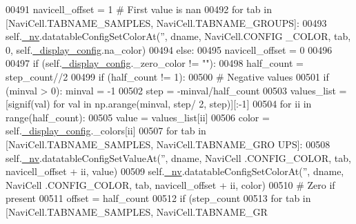 \begin{DoxyCode}
00491                 navicell\_offset = 1 \textcolor{comment}{# First value is nan}
00492                 \textcolor{keywordflow}{for} tab \textcolor{keywordflow}{in} [NaviCell.TABNAME\_SAMPLES, NaviCell.TABNAME\_GROUPS]:
00493                     self.\hyperlink{classnavicom_1_1navicom_1_1NaviCom_afff3fd56fa16a68bab52ba8d801e325a}{_nv}.datatableConfigSetColorAt(\textcolor{stringliteral}{''}, dname, NaviCell.CONFIG
      \_COLOR, tab, 0, self.\hyperlink{classnavicom_1_1navicom_1_1NaviCom_ab8ddca454f674629472d8bfec46ac76f}{_display_config}.na\_color)
00494             \textcolor{keywordflow}{else}:
00495                 navicell\_offset = 0
00496 
00497             \textcolor{keywordflow}{if} (self.\hyperlink{classnavicom_1_1navicom_1_1NaviCom_ab8ddca454f674629472d8bfec46ac76f}{_display_config}.\_zero\_color != \textcolor{stringliteral}{""}):
00498                 half\_count = step\_count//2
00499                 \textcolor{keywordflow}{if} (half\_count != 1):
00500                     \textcolor{comment}{# Negative values}
00501                     \textcolor{keywordflow}{if} (minval > 0): minval = -1
00502                     step = -minval/half\_count
00503                     values\_list = [signif(val) \textcolor{keywordflow}{for} val \textcolor{keywordflow}{in} np.arange(minval, step/
      2, step)][:-1]
00504                     \textcolor{keywordflow}{for} ii \textcolor{keywordflow}{in} range(half\_count):
00505                        value = values\_list[ii]
00506                        color = self.\hyperlink{classnavicom_1_1navicom_1_1NaviCom_ab8ddca454f674629472d8bfec46ac76f}{_display_config}.\_colors[ii]
00507                        \textcolor{keywordflow}{for} tab \textcolor{keywordflow}{in} [NaviCell.TABNAME\_SAMPLES, NaviCell.TABNAME\_GRO
      UPS]:
00508                            self.\hyperlink{classnavicom_1_1navicom_1_1NaviCom_afff3fd56fa16a68bab52ba8d801e325a}{_nv}.datatableConfigSetValueAt(\textcolor{stringliteral}{''}, dname, NaviCell
      .CONFIG\_COLOR, tab, navicell\_offset + ii, value)
00509                            self.\hyperlink{classnavicom_1_1navicom_1_1NaviCom_afff3fd56fa16a68bab52ba8d801e325a}{_nv}.datatableConfigSetColorAt(\textcolor{stringliteral}{''}, dname, NaviCell
      .CONFIG\_COLOR, tab, navicell\_offset + ii, color)
00510                     \textcolor{comment}{# Zero if present}
00511                     offset = half\_count
00512                     \textcolor{keywordflow}{if} (step\_count%
00513                         \textcolor{keywordflow}{for} tab \textcolor{keywordflow}{in} [NaviCell.TABNAME\_SAMPLES, NaviCell.TABNAME\_GR

\end{DoxyCode}
